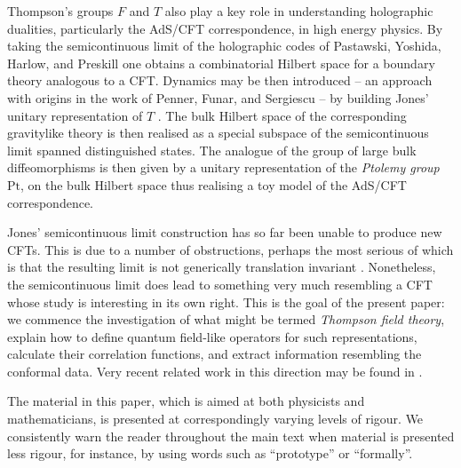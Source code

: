 \documentclass[11pt,oneside]{amsart}
\theoremstyle{plain}%
\theoremstyle{definition}
\theoremstyle{remark}
\begin{document}
Thompson's groups $F$ and $T$ also play a key role in understanding holographic dualities, particularly the AdS/CFT correspondence, in high energy physics. By taking the semicontinuous limit of the holographic codes of Pastawski, Yoshida, Harlow, and Preskill \cite{pastawski_holographic_2015} one obtains a combinatorial Hilbert space for a boundary theory analogous to a CFT. Dynamics may be then
introduced -- an approach with origins in the work of Penner, Funar, and Sergiescu \cites{penner_universal_1993,funar_central_2010,schneps_geometric_1997} -- by building Jones' unitary representation of $T$ \cite{osborneDynamicsHolographicCodes2017b}. The bulk Hilbert space of the corresponding gravitylike theory is
then realised as a special subspace of the semicontinuous limit spanned distinguished states. The analogue of the group of large bulk diffeomorphisms is then given by a unitary representation of the \emph{Ptolemy group} $\text{Pt}$, on the bulk Hilbert space thus realising a toy model of the AdS/CFT correspondence.

Jones' semicontinuous limit construction has so far been unable to produce new CFTs. This is due to a number of obstructions, perhaps the most serious of which is that the resulting limit is not generically translation invariant \cites{jones_no-go_2016,klieschContinuumLimitsHomogeneous2018}. Nonetheless, the semicontinuous limit does lead to something very much resembling a CFT whose study is interesting in its own right. This is the goal of the present paper: we commence the investigation of what might be termed \emph{Thompson field theory}, explain how to define quantum field-like operators for such representations, calculate their correlation functions, and extract information resembling the conformal data. Very recent related work in this direction may be found in \cites{brothierOperatoralgebraicConstructionGauge2019,osborneContinuumLimitsQuantum2019}.

The material in this paper, which is aimed at both physicists and mathematicians, is presented at correspondingly varying levels of rigour. We consistently warn the reader throughout the main text when material is presented less rigour, for instance, by using words such as ``prototype'' or ``formally''.
\end{document}

